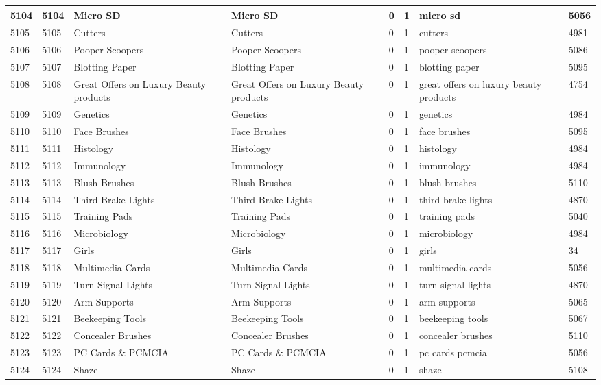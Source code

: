 \begin{longtable}{|l|l|l|l|l|l|l|l|}
5104 & 5104 & Micro SD & Micro SD & 0 & 1 & micro sd & 5056 \\ \hline 
5105 & 5105 & Cutters & Cutters & 0 & 1 & cutters & 4981 \\ \hline 
5106 & 5106 & Pooper Scoopers & Pooper Scoopers & 0 & 1 & pooper scoopers & 5086 \\ \hline 
5107 & 5107 & Blotting Paper & Blotting Paper & 0 & 1 & blotting paper & 5095 \\ \hline 
5108 & 5108 & Great Offers on Luxury Beauty products & Great Offers on Luxury Beauty products & 0 & 1 & great offers on luxury beauty products & 4754 \\ \hline 
5109 & 5109 & Genetics & Genetics & 0 & 1 & genetics & 4984 \\ \hline 
5110 & 5110 & Face Brushes & Face Brushes & 0 & 1 & face brushes & 5095 \\ \hline 
5111 & 5111 & Histology & Histology & 0 & 1 & histology & 4984 \\ \hline 
5112 & 5112 & Immunology & Immunology & 0 & 1 & immunology & 4984 \\ \hline 
5113 & 5113 & Blush Brushes & Blush Brushes & 0 & 1 & blush brushes & 5110 \\ \hline 
5114 & 5114 & Third Brake Lights & Third Brake Lights & 0 & 1 & third brake lights & 4870 \\ \hline 
5115 & 5115 & Training Pads & Training Pads & 0 & 1 & training pads & 5040 \\ \hline 
5116 & 5116 & Microbiology & Microbiology & 0 & 1 & microbiology & 4984 \\ \hline 
5117 & 5117 & Girls & Girls & 0 & 1 & girls & 34 \\ \hline 
5118 & 5118 & Multimedia Cards & Multimedia Cards & 0 & 1 & multimedia cards & 5056 \\ \hline 
5119 & 5119 & Turn Signal Lights & Turn Signal Lights & 0 & 1 & turn signal lights & 4870 \\ \hline 
5120 & 5120 & Arm Supports & Arm Supports & 0 & 1 & arm supports & 5065 \\ \hline 
5121 & 5121 & Beekeeping Tools & Beekeeping Tools & 0 & 1 & beekeeping tools & 5067 \\ \hline 
5122 & 5122 & Concealer Brushes & Concealer Brushes & 0 & 1 & concealer brushes & 5110 \\ \hline 
5123 & 5123 & PC Cards \& PCMCIA & PC Cards \& PCMCIA & 0 & 1 & pc cards pcmcia & 5056 \\ \hline 
5124 & 5124 & Shaze & Shaze & 0 & 1 & shaze & 5108 \\ \hline 

\end{longtable}
